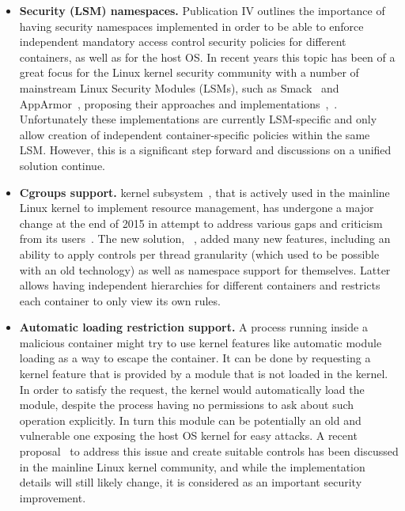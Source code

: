 \begin{itemize}
	\item \textbf{Security (LSM) namespaces.} Publication IV outlines the importance of having security namespaces implemented in order to be able to enforce independent mandatory access control security policies for different containers, as well as for the host OS. In recent years this topic has been of a great focus for the Linux kernel security community with a number of mainstream Linux Security Modules (LSMs), such as Smack~\cite{smack} and AppArmor~\cite{bauer2006paranoid}, proposing their approaches and implementations~\cite{smackns},~\cite{apparmorns}. Unfortunately these implementations are currently LSM-specific and only allow creation of independent container-specific policies within the same LSM. However, this is a significant step forward and discussions on a unified solution continue.
	\item \textbf{Cgroups support.}  kernel subsystem~\cite{cgroupsv2}, that is actively used in the mainline Linux kernel to implement resource management, has undergone a major change at the end of 2015 in attempt to address various gaps and criticism from its users~\cite{rosen2016}. The new solution, ~\cite{cgroupsv2}, added many new features, including an ability to apply controls per thread granularity (which used to be possible with an old  technology) as well as namespace support for  themselves. Latter allows having independent  hierarchies for different containers and restricts each container to only view its own  rules. 
	\item \textbf{Automatic loading restriction support.} A process running inside a malicious container might try to use kernel features like automatic module loading as a way to escape the container. It can be done by requesting a kernel feature that is provided by a module that is not loaded in the kernel. In order to satisfy the request, the kernel would automatically load the module, despite the process having no permissions to ask about such operation explicitly. In turn this module can be potentially an old and vulnerable one exposing the host OS kernel for easy attacks. A recent proposal~\cite{harouni2017} to address this issue and create suitable controls has been discussed in the mainline Linux kernel community, and while the implementation details will still likely change, it is considered as an important security improvement. 

\end{itemize}

